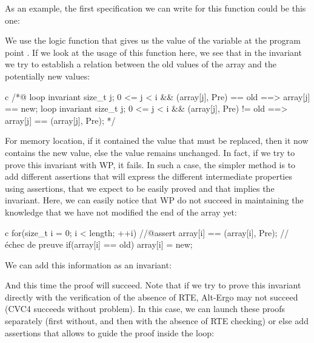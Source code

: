 As an example, the first specification we can write for this function
could be this one:






We use the logic function  that gives us the
value of the variable  at the program point .
If we look at the usage of this function here, we see that in the
invariant we try to establish a relation between the old values of the
array and the potentially new values:



\begin{CodeBlock}{c}
/*@
  loop invariant \forall size_t j; 0 <= j < i && \at(array[j], Pre) == old 
                   ==> array[j] == new;
  loop invariant \forall size_t j; 0 <= j < i && \at(array[j], Pre) != old 
                   ==> array[j] == \at(array[j], Pre);
*/
\end{CodeBlock}



For memory location, if it contained the value that must be replaced,
then it now contains the new value, else the value remains unchanged. In
fact, if we try to prove this invariant with WP, it fails. In such a
case, the simpler method is to add different assertions that will
express the different intermediate properties using assertions, that we
expect to be easily proved and that implies the invariant. Here, we can
easily notice that WP do not succeed in maintaining the knowledge that
we have not modified the end of the array yet:



\begin{CodeBlock}{c}
for(size_t i = 0; i < length; ++i){
    //@assert array[i] == \at(array[i], Pre); // échec de preuve
    if(array[i] == old) array[i] = new;
}
\end{CodeBlock}



We can add this information as an invariant:






And this time the proof will succeed. Note that if we try to prove this
invariant directly with the verification of the absence of RTE, Alt-Ergo
may not succeed (CVC4 succeeds without problem). In this case, we can
launch these proofs separately (first without, and then with the absence
of RTE checking) or else add assertions that allows to guide the proof
inside the loop:



